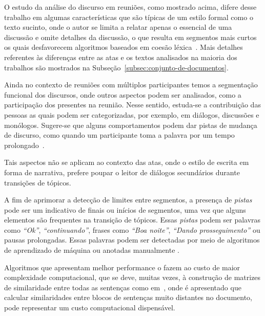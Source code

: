 

O estudo da análise do discurso em reuniões, como mostrado acima, difere desse trabalho em algumas características que são típicas de um estilo formal como o texto sucinto, onde o autor se limita a relatar apenas o essencial de uma discussão e omite detalhes da discussão, o que resulta em segmentos mais curtos os quais desfavorecem algoritmos baseados em coesão léxica~\cite{Choi2000}. Mais detalhes referentes às diferenças entre as atas e os textos analisados na maioria dos trabalhos são mostrados na Subseção~\ref{subsec:conjunto-de-documentos}.


Ainda no contexto de reuniões com múltiplos participantes temos a segmentação funcional dos discursos, onde outros aspectos podem ser analisados, como a participação dos presentes na reunião. Nesse sentido, estuda-se a contribuição das pessoas as quais podem ser categorizadas,  por exemplo, em diálogos, discussões e monólogos. Sugere-se que alguns comportamentos podem dar pistas de mudança de discurso, como quando um participante toma a palavra por um tempo prolongado~\cite{Bokaei2015}. 

Tais aspectos não se aplicam ao contexto das atas, onde o estilo de escrita em forma de narrativa, prefere poupar o leitor de diálogos secundários durante transições de tópicos.

%

A fim de aprimorar a detecção de limites entre segmentos, a presença de \textit{pistas} pode ser um indicativo de finais ou inícios de segmentos, uma vez que alguns elementos são frequentes na transição de tópicos. Essas \textit{pistas} podem ser palavras como \textit{``Ok''}, \textit{``continuando''}, frases como \textit{``Boa noite''}, \textit{``Dando prosseguimento''} ou pausas prolongadas. Essas palavras podem ser detectadas por meio de algoritmos de aprendizado de máquina ou anotadas manualmente
\cite{Hsueh2006} %
\cite{Galley2003} 
\cite{Beeferman1999}
.


Algoritmos que apresentam melhor performance o fazem ao custo de maior complexidade computacional, que se deve, muitas vezes, à construção de matrizes de similaridade entre todas as sentenças como em~\cite{Choi2000}, onde é apresentado que calcular similaridades entre blocos de sentenças muito distantes no documento, pode representar um custo computacional dispensável. %

